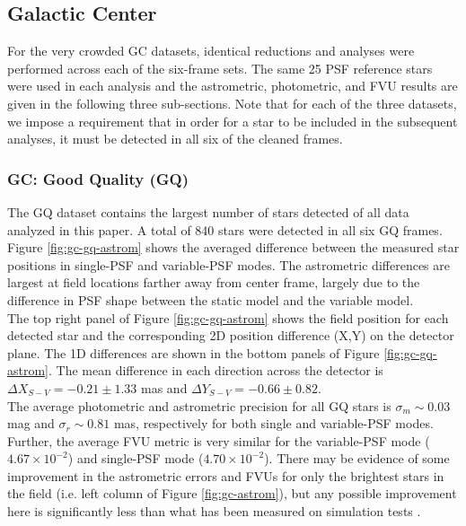 \documentclass[]{spie}  %
\begin{document}
\subsection{Galactic Center} \label{sec:results-gc}

\indent For the very crowded GC datasets, identical reductions and analyses were performed across each of the six-frame sets. The same 25 PSF reference stars were used in each analysis and the astrometric, photometric, and FVU results are given in the following three sub-sections. Note that for each of the three datasets, we impose a requirement that in order for a star to be included in the subsequent analyses, it must be detected in all six of the cleaned frames.

\subsubsection{GC: Good Quality (GQ)} \label{sec:results-gc-GQ}
\noindent The GQ dataset contains the largest number of stars detected of all data analyzed in this paper. A total of 840 stars were detected in all six GQ frames. Figure \ref{fig:gc-gq-astrom} shows the averaged difference between the measured star positions in single-PSF and variable-PSF modes. The astrometric differences are largest at field locations farther away from center frame, largely due to the difference in PSF shape between the static model and the variable model.
\\
\indent The top right panel of Figure \ref{fig:gc-gq-astrom} shows the field position for each detected star and the corresponding 2D position difference (X,Y) on the detector plane. The 1D differences are shown in the bottom panels of Figure \ref{fig:gc-gq-astrom}. The mean difference in each direction across the detector is $\Delta X_{S-V} = -0.21 \pm 1.33$ mas and $\Delta Y_{S-V} = -0.66 \pm 0.82$.
\\
\indent The average photometric and astrometric precision for all GQ stars is $\sigma_{{m}}{\sim}0.03$ mag and $\sigma_{{r}}{\sim}0.81$ mas, respectively for both single and variable-PSF modes. Further, the average FVU metric is very similar for the variable-PSF mode ($4.67\times10^{-2}$) and single-PSF mode ($4.70\times10^{-2}$). There may be evidence of some improvement in the astrometric errors and FVUs for only the brightest stars in the field (i.e. left column of Figure \ref{fig:gc-astrom}), but any possible improvement here is significantly less than what has been measured on simulation tests \cite{Turri:inprep}.
\end{document}
